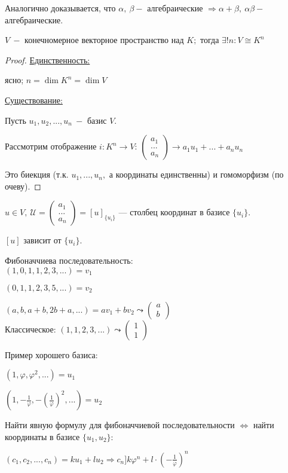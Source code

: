 \begin{remark}
    Аналогично доказывается, что $\alpha,\ \beta-$ алгебраические 
$\Rightarrow \alpha+\beta,\ \alpha\beta-$ алгебраические.
\end{remark}

\begin{theorem}
    $V\ -$ конечномерное векторное пространство над $K;$ тогда 
$\exists!n:V\cong K^n$
\end{theorem}

\begin{proof} 
    \underline{Единственность:}
    
    ясно; $n=\dim K^n=\dim V$
    
    \underline{Существование:} 
    
    Пусть $u_1,u_2,...,u_n\ -$ базис $V$.
    
    Рассмотрим отображение $i:K^n\rightarrow V$:
    $\begin{pmatrix}
    a_1\\...\\ a_n
    \end{pmatrix}\rightarrow a_1u_1+...+a_nu_n$
    
    Это биекция (т.к. $u_1,...,u_n,$ а координаты единственны) и 
гомоморфизм (по очеву).
\end{proof}

\begin{designation}
    $u\in V,\ \mathcal{U}=\begin{pmatrix}
    a_1\\...\\ a_n
    \end{pmatrix}=[u]_{\{u_i\}}$ — столбец координат в базисе $\{u_i\}$. 
    
    $[u]$ зависит от $\{u_i\}.$
\end{designation}

\begin{example}
    Фибоначчиева последовательность: \\
    $(1,0,1,1,2,3,...)=v_1$ 
    
    $(0,1,1,2,3,5,...)=v_2$ 
    
    $(a,b,a+b,2b+a,...)=av_1+bv_2\leadsto \begin{pmatrix} a \\ b 
\end{pmatrix}$ \\
    Классическое: $(1,1,2,3,...)\leadsto \begin{pmatrix} 1 \\ 1    
\end{pmatrix}$ 
\end{example}

\begin{example}
    Пример хорошего базиса: 
    
    $(1,\varphi,\varphi^2,...)=u_1$
    
    $(1,-\frac{1}{\varphi},-(\frac{1}{\varphi})^2,...)=u_2$ 
    
    Найти явную формулу для фибоначчиевой последовательности 
$\Leftrightarrow$  найти координаты в базисе $\{u_1,u_2\}:$ 
    
    $(c_1,c_2,...,c_n)=ku_1+lu_2\Rightarrow 
c_n]k\varphi^n+l\cdot(-\frac{1}{\varphi})^n$    
\end{example}
